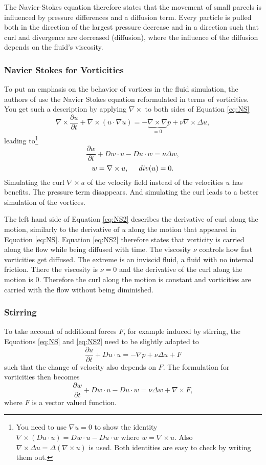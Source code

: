 The Navier-Stokes equation therefore states that the movement of small parcels is influenced by pressure differences and a diffusion term. Every particle is pulled both in the direction of the largest pressure decrease and in a direction such that curl and divergence are decreased (diffusion), where the influence of the diffusion depends on the fluid's viscosity.

\subsubsection{Navier Stokes for Vorticities}
To put an emphasis on the behavior of vortices in the fluid simulation, the authors of \cite{simplicialFluids} use the Navier Stokes equation reformulated in terms of vorticities. You get such a description by applying $\nabla \times$ to both sides of Equation \ref{eq:NS}
\[\nabla \times \frac{\partial u}{ \partial{t}} + \nabla \times (u \cdot \nabla u) = - \underbrace{\nabla\times \nabla}_{=0} p + \nu \nabla \times \Delta u,\]
leading to\footnote{You need to use $\nabla u = 0$ to show the identity $\nabla \times (Du \cdot u) = D w \cdot u - Du \cdot w$ where $w = \nabla \times u$. Also $\nabla \times \Delta u = \Delta (\nabla \times u)$ is used. Both identities are easy to check by writing them out. }
\begin{equation}\frac{\partial w}{\partial t} + Dw\cdot u - Du \cdot w =  \nu \Delta w,\label{eq:NS2}\end{equation}
\[w = \nabla \times u,\hspace{0.5cm} div(u) = 0.\]
Simulating the curl $\nabla \times u$ of the velocity field instead of the velocities $u$ has benefits. The pressure term disappears. And simulating the curl leads to a better simulation of the vortices. 

The left hand side of Equation \ref{eq:NS2} describes the derivative of curl along the motion, similarly to the derivative of $u$ along the motion that appeared in Equation \ref{eq:NS}. Equation \ref{eq:NS2} therefore states that  vorticity is carried along the flow while being diffused with time. The viscosity $\nu$ controls how fast vorticities get diffused. The extreme is an inviscid fluid, a fluid with no internal friction. There the viscosity is $\nu = 0$ and the derivative of the curl along the motion is 0. Therefore the curl along the motion is constant and vorticities are carried with the flow without being diminished.

\subsubsection{Stirring}
To take account of additional forces $F$, for example induced by stirring, the Equations \ref{eq:NS} and \ref{eq:NS2} need to be slightly adapted to
\[\frac{\partial u}{\partial t} + Du \cdot u = -\nabla p + \nu \Delta u + F\]
such that the change of velocity also depends on $F$. The formulation for vorticities then becomes
\begin{equation}\frac{\partial w}{\partial t} + Dw\cdot u - Du \cdot w =  \nu \Delta w + \nabla \times F \label{eq:NS3},\end{equation}
where $F$ is a vector valued function.

